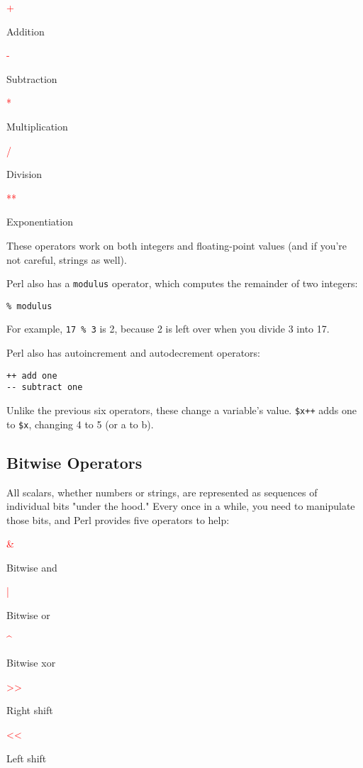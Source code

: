 \textcolor{red}{+}
\begin{adjustwidth}{1cm}{}
Addition
\end{adjustwidth}
\textcolor{red}{-}
\begin{adjustwidth}{1cm}{}
Subtraction
\end{adjustwidth}
\textcolor{red}{*}
\begin{adjustwidth}{1cm}{}
Multiplication
\end{adjustwidth}
\textcolor{red}{/}
\begin{adjustwidth}{1cm}{}
Division
\end{adjustwidth}
\textcolor{red}{**}
\begin{adjustwidth}{1cm}{}
Exponentiation
\end{adjustwidth}

These operators work on both integers and floating-point values (and if you're not careful, strings as well).

Perl also has a \verb|modulus| operator, which computes the remainder of two integers:

\begin{lstlisting}
% modulus
\end{lstlisting}

For example, \verb|17 % 3| is 2, because 2 is left over when you divide 3 into 17.

Perl also has autoincrement and autodecrement operators:

\begin{lstlisting}
++ add one
-- subtract one
\end{lstlisting}

Unlike the previous six operators, these change a variable's value. \verb|$x++| adds one to \verb|$x|, changing 4 to 5 (or a to b). 

\subsection{Bitwise Operators}
All scalars, whether numbers or strings, are represented as sequences of individual bits "under the hood." Every once in a while, you need to manipulate those bits, and Perl provides five operators to help:

\textcolor{red}{\&}
\begin{adjustwidth}{1cm}{}
Bitwise and
\end{adjustwidth}
\textcolor{red}{|}
\begin{adjustwidth}{1cm}{}
Bitwise or
\end{adjustwidth}
\textcolor{red}{\^{}}
\begin{adjustwidth}{1cm}{}
Bitwise xor
\end{adjustwidth}
\textcolor{red}{\textgreater\textgreater}
\begin{adjustwidth}{1cm}{}
Right shift
\end{adjustwidth}
\textcolor{red}{\textless\textless}
\begin{adjustwidth}{1cm}{}
Left shift
\end{adjustwidth}

